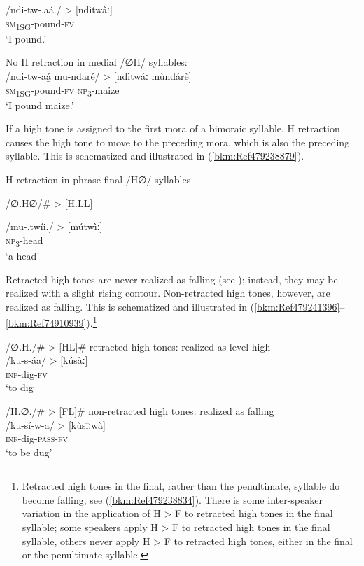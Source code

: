 \ex
/ndi-tw-.aá̲./ > [ndìtwâː]\\
\textsc{sm}\textsubscript{1SG}-pound-\textsc{fv}\\
\glt ‘I pound.’
\z\z

\ea
\label{bkm:Ref97890340}
  No H retraction in medial /∅H/ syllables:\\
\gll /ndi-tw-aá̲    mu-ndaré/ >{ [ndìtwáː mùndárè}]\\
\textsc{sm}\textsubscript{1SG}-pound-\textsc{fv}  \textsc{np}\textsubscript{3}-maize\\
\glt ‘I pound maize.’
\z

If a high tone is assigned to the first mora of a bimoraic syllable, H retraction causes the high tone to move to the preceding mora, which is also the preceding syllable. This is schematized and illustrated in (\ref{bkm:Ref479238879}).

\ea
\label{bkm:Ref479238879}
  H retraction in phrase-final /H∅/ syllables

\ea
/∅.H∅/\# > [H.LL]

\ex
\gll /mu-.twíi./ > [mútwìː]\\
\textsc{np}\textsubscript{3}-head\\
\glt ‘a head’
\z\z

Retracted high tones are never realized as falling (see ); instead, they may be realized with a slight rising contour. Non-retracted high tones, however, are realized as falling. This is schematized and illustrated in (\ref{bkm:Ref479241396}--\ref{bkm:Ref74910939}).\footnote{Retracted high tones in the final, rather than the penultimate, syllable do become falling, see (\ref{bkm:Ref479238834}). There is some inter-speaker variation in the application of H > F to retracted high tones in the final syllable; some speakers apply H > F to retracted high tones in the final syllable, others never apply H > F to retracted high tones, either in the final or the penultimate syllable.}

\ea
\label{bkm:Ref479241396}
  /∅.H./\# > [HL]\#  retracted high tones: realized as level high\\
/ku-s-áa/ > [kúsàː]\\
\textsc{inf}-dig-\textsc{fv}\\
\glt ‘to dig
\z

\ea
\label{bkm:Ref74910939}
  /H.∅./\# > [FL]\#  non-retracted high tones: realized as falling\\
/ku-sí-w-a/ > [kùsîːwà]\\
\textsc{inf}-dig-\textsc{pass}-\textsc{fv}\\
\glt ‘to be dug’
\z

